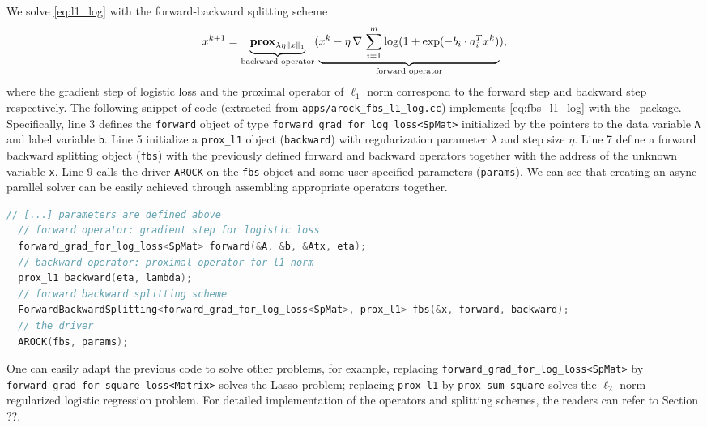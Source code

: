 We solve \eqref{eq:l1_log} with the forward-backward splitting scheme
\begin{equation}\label{eq:fbs_l1_log}
x^{k+1} = \underbrace{\mathbf{prox}_{\lambda \eta \|x\|_1}}_{\text{backward operator}} (\underbrace{x^k - \eta \, \nabla \,\sum_{i = 1}^m \log (1 + \exp(-b_i \cdot a_i^T x^k)}_{\text{forward operator}}),
\end{equation}  
where the gradient step of logistic loss and the proximal operator of $\ell_1$ norm correspond to the
forward step and backward step respectively. The following snippet of code (extracted from 
\texttt{apps/arock\_fbs\_l1\_log.cc}) implements \eqref{eq:fbs_l1_log} with the \pkg~package. 
Specifically, line 3 defines the \texttt{forward} object of type \texttt{forward\_grad\_for\_log\_loss<SpMat>} 
initialized by the pointers to the data variable \texttt{A} and label variable \texttt{b}. Line 5  initialize a 
\texttt{prox\_l1} object (\texttt{backward}) with regularization parameter $\lambda$ and step size $\eta$. 
Line 7 define a forward backward splitting object (\texttt{fbs}) with the previously defined forward and 
backward operators together with the address of the unknown variable \texttt{x}. Line 9 calls the driver 
\texttt{AROCK} on the \texttt{fbs} object and some user specified parameters (\texttt{params}). We can see that creating an async-parallel solver can be 
easily achieved through assembling appropriate operators together.  
\begin{lstlisting}[language=C++]
  // [...] parameters are defined above
  // forward operator: gradient step for logistic loss
  forward_grad_for_log_loss<SpMat> forward(&A, &b, &Atx, eta);
  // backward operator: proximal operator for l1 norm 
  prox_l1 backward(eta, lambda);
  // forward backward splitting scheme
  ForwardBackwardSplitting<forward_grad_for_log_loss<SpMat>, prox_l1> fbs(&x, forward, backward);  
  // the driver
  AROCK(fbs, params);  
\end{lstlisting}
One can easily adapt the previous code to solve other problems, for example, replacing \texttt{forward\_grad\_for\_log\_loss<SpMat>} by \texttt{forward\_grad\_for\_square\_loss<Matrix>} solves the Lasso problem; replacing \texttt{prox\_l1} by \texttt{prox\_sum\_square} solves the $\ell_2$ norm regularized logistic regression problem. For detailed implementation of the operators and splitting schemes, the readers can refer to Section ??.
